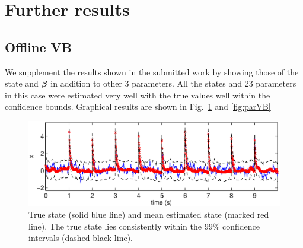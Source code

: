 \documentclass{article}
\begin{document}
\section{Further results}

\subsection{Offline VB}
	
We supplement the results shown in the submitted work by showing those of the state and ${\bm \beta}$ in addition to other 3 parameters. All the states and 23 parameters in this case were estimated very well with the true values well within the confidence bounds. Graphical results are shown in Fig.~\ref{fig:stateVB} and \ref{fig:parVB}

 \begin{figure}[h!]
 \begin{center}
   \includegraphics[width = 6in]{./Figures/stateVB.eps}

 \end{center}
 \caption{True state (solid blue line) and mean estimated state (marked red line). The true state lies consistently within the 99\% confidence intervals (dashed black line).}  \label{fig:stateVB}
 \end{figure}
 	
\end{document}
